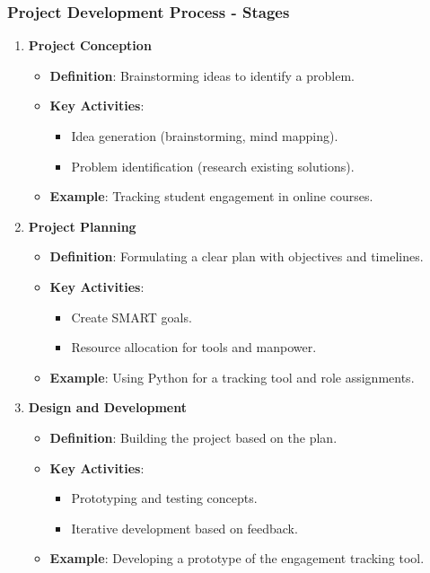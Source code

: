 \documentclass[aspectratio=169]{beamer}
\begin{document}
\begin{frame}[fragile]
    \frametitle{Project Development Process - Stages}
    \begin{enumerate}
        \item \textbf{Project Conception}
            \begin{itemize}
                \item \textbf{Definition}: Brainstorming ideas to identify a problem.
                \item \textbf{Key Activities}:
                    \begin{itemize}
                        \item Idea generation (brainstorming, mind mapping).
                        \item Problem identification (research existing solutions).
                    \end{itemize}
                \item \textbf{Example}: Tracking student engagement in online courses.
            \end{itemize}
        
        \item \textbf{Project Planning}
            \begin{itemize}
                \item \textbf{Definition}: Formulating a clear plan with objectives and timelines.
                \item \textbf{Key Activities}:
                    \begin{itemize}
                        \item Create SMART goals.
                        \item Resource allocation for tools and manpower.
                    \end{itemize}
                \item \textbf{Example}: Using Python for a tracking tool and role assignments.
            \end{itemize}

        \item \textbf{Design and Development}
            \begin{itemize}
                \item \textbf{Definition}: Building the project based on the plan.
                \item \textbf{Key Activities}:
                    \begin{itemize}
                        \item Prototyping and testing concepts.
                        \item Iterative development based on feedback.
                    \end{itemize}
                \item \textbf{Example}: Developing a prototype of the engagement tracking tool.
            \end{itemize}
    \end{enumerate}
\end{frame}
\end{document}
